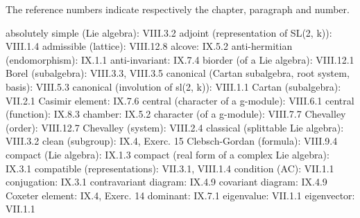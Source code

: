 
The reference numbers indicate respectively the chapter, paragraph and number.

absolutely simple (Lie algebra): VIII.3.2 adjoint (representation of SL(2, k)): VIII.1.4 admissible (lattice): VIII.12.8 alcove: IX.5.2 anti-hermitian (endomorphism): IX.1.1 anti-invariant: IX.7.4 biorder (of a Lie algebra): VIII.12.1 Borel (subalgebra): VIII.3.3, VIII.3.5 canonical (Cartan subalgebra, root system, basis): VIII.5.3 canonical (involution of sl(2, k)): VIII.1.1 Cartan (subalgebra): VII.2.1 Casimir element: IX.7.6 central (character of a g-module): VIII.6.1 central (function): IX.8.3 chamber: IX.5.2 character (of a g-module): VIII.7.7 Chevalley (order): VIII.12.7 Chevalley (system): VIII.2.4 classical (splittable Lie algebra): VIII.3.2 clean (subgroup): IX.4, Exerc. 15 Clebsch-Gordan (formula): VIII.9.4 compact (Lie algebra): IX.1.3 compact (real form of a complex Lie algebra): IX.3.1 compatible (representations): VII.3.1, VIII.1.4 condition (AC): VII.1.1 conjugation: IX.3.1 contravariant diagram: IX.4.9 covariant diagram: IX.4.9 Coxeter element: IX.4, Exerc. 14 dominant: IX.7.1 eigenvalue: VII.1.1 eigenvector: VII.1.1

